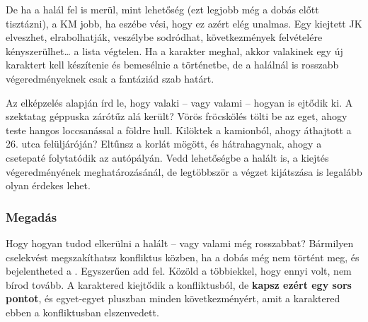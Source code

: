 De ha a halál fel is merül, mint lehetőség (ezt legjobb még a dobás előtt tisztázni), a KM jobb, ha eszébe vési, hogy ez azért elég unalmas. Egy kiejtett JK elveszhet, elrabolhatják, veszélybe sodródhat, következmények felvételére kényszerülhet… a lista végtelen. Ha a karakter meghal, akkor valakinek egy új karaktert kell készítenie és bemesélnie a történetbe, de a halálnál is rosszabb végeredményeknek csak a fantáziád szab határt.

Az elképzelés alapján írd le, hogy valaki – vagy valami – hogyan is ejtődik ki. A szektatag géppuska zárótűz alá került? Vörös fröcskölés tölti be az eget, ahogy teste hangos loccsanással a földre hull. Kilöktek a kamionból, ahogy áthajtott a 26. utca felüljáróján? Eltűnsz a korlát mögött, és hátrahagynak, ahogy a csetepaté folytatódik az autópályán. Vedd lehetőségbe a halált is, a kiejtés végeredményének meghatározásánál, de legtöbbször a végzet kijátszása is legalább olyan érdekes lehet.

\newpage


\subsubsection{Megadás}

Hogy hogyan tudod elkerülni a halált – vagy valami még rosszabbat? Bármilyen cselekvést megszakíthatsz konfliktus közben, ha a dobás még nem történt meg, és bejelentheted a . Egyszerűen add fel. Közöld a többiekkel, hogy ennyi volt, nem bírod tovább. A karaktered kiejtődik a konfliktusból, de \textbf{kapsz ezért egy sors pontot}, és egyet‑egyet pluszban minden következményért, amit a karaktered ebben a konfliktusban elszenvedett.


